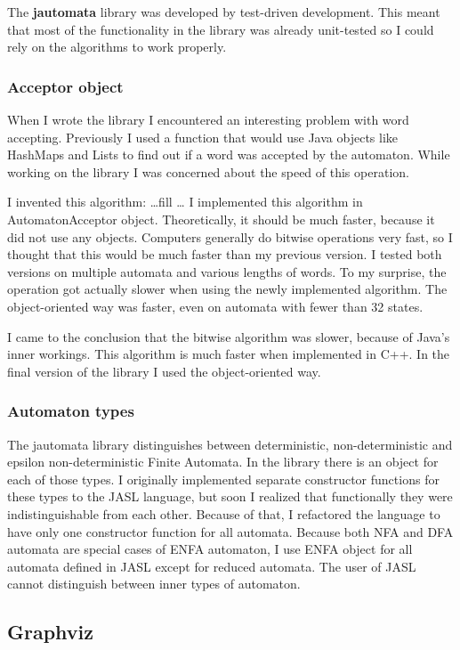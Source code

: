 \documentclass{ctuthesis}
\begin{document}
The \textbf{jautomata} library was developed by test-driven development. This meant that most of the functionality in the library was already unit-tested so I could rely on the algorithms to work properly. 

\subsubsection{Acceptor object}
When I wrote the library I encountered an interesting problem with word accepting. Previously I used a function that would use Java objects like HashMaps and Lists to find out if a word was accepted by the automaton. While working on the library I was concerned about the speed of this operation. 

I invented this algorithm: \ldots fill \ldots %
I implemented this algorithm in AutomatonAcceptor object. Theoretically, it should be much faster, because it did not use any objects. Computers generally do bitwise operations very fast, so I thought that this would be much faster than my previous version. I tested both versions on multiple automata and various lengths of words. To my surprise, the operation got actually slower when using the newly implemented algorithm. The object-oriented way was faster, even on automata with fewer than 32 states. 

I came to the conclusion that the bitwise algorithm was slower, because of Java's inner workings. This algorithm is much faster when implemented in C++. In the final version of the library I used the object-oriented way.

\subsubsection{Automaton types}
The jautomata library distinguishes between deterministic, non-deterministic and epsilon non-deterministic Finite Automata. In the library there is an object for each of those types. I originally implemented separate constructor functions for these types to the JASL language, but soon I realized that functionally they were indistinguishable from each other. Because of that, I refactored the language to have only one constructor function for all automata. Because both NFA and DFA automata are special cases of ENFA automaton, I use ENFA object for all automata defined in JASL except for reduced automata. The user of JASL cannot distinguish between inner types of automaton.


\subsection{Graphviz}
\end{document}
